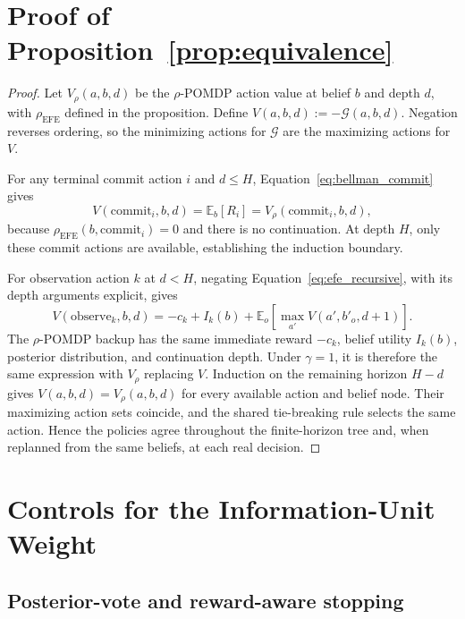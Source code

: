 \documentclass[runningheads]{llncs}
\begin{document}
\appendix

\FloatBarrier
\section{Proof of Proposition~\ref{prop:equivalence}}
\label{app:proof}

\begin{proof}
Let $V_\rho(a,b,d)$ be the $\rho$-POMDP action value at belief $b$ and depth $d$, with $\rho_{\mathrm{EFE}}$ defined in the proposition. Define $V(a,b,d):=-\mathcal G(a,b,d)$. Negation reverses ordering, so the minimizing actions for $\mathcal G$ are the maximizing actions for $V$.

For any terminal commit action $i$ and $d\le H$, Equation~\ref{eq:bellman_commit} gives
\[
V(\mathrm{commit}_i,b,d)=\mathbb E_b[R_i]
=V_\rho(\mathrm{commit}_i,b,d),
\]
because $\rho_{\mathrm{EFE}}(b,\mathrm{commit}_i)=0$ and there is no continuation. At depth $H$, only these commit actions are available, establishing the induction boundary.

For observation action $k$ at $d<H$, negating Equation~\ref{eq:efe_recursive}, with its depth arguments explicit, gives
\[
V(\mathrm{observe}_k,b,d)=-c_k+I_k(b)
+\mathbb E_o\!\left[\max_{a'}V(a',b'_o,d+1)\right].
\]
The $\rho$-POMDP backup has the same immediate reward $-c_k$, belief utility $I_k(b)$, posterior distribution, and continuation depth. Under $\gamma=1$, it is therefore the same expression with $V_\rho$ replacing $V$. Induction on the remaining horizon $H-d$ gives $V(a,b,d)=V_\rho(a,b,d)$ for every available action and belief node. Their maximizing action sets coincide, and the shared tie-breaking rule selects the same action. Hence the policies agree throughout the finite-horizon tree and, when replanned from the same beliefs, at each real decision.
\end{proof}

\FloatBarrier
\section{Controls for the Information-Unit Weight}
\label{app:full_tables}

\subsection{Posterior-vote and reward-aware stopping}
\end{document}
